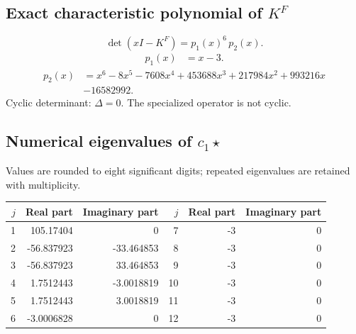 \documentclass[10pt,a4paper]{article}
\begin{document}
\subsection*{Exact characteristic polynomial of $K^F$}
\[\det(xI-K^F)=p_{1}(x)^{6}\,p_{2}(x).\]
\[\begin{aligned}p_{1}(x)&=x - 3.\end{aligned}\]
\[\begin{aligned}p_{2}(x)&=x^{6} - 8 x^{5} - 7608 x^{4} + 453688 x^{3} + 217984 x^{2} + 993216 x\\&-16582992.\end{aligned}\]
Cyclic determinant: $\Delta=0$. The specialized operator is not cyclic.
\subsection*{Numerical eigenvalues of $c_1\star$}
Values are rounded to eight significant digits; repeated eigenvalues are retained with multiplicity.
\begin{center}\small\begin{tabular}{rrr@{\qquad}rrr}\toprule $j$ & Real part & Imaginary part & $j$ & Real part & Imaginary part\\\midrule
1 & 105.17404 & 0 & 7 & -3 & 0\\
2 & -56.837923 & -33.464853 & 8 & -3 & 0\\
3 & -56.837923 & 33.464853 & 9 & -3 & 0\\
4 & 1.7512443 & -3.0018819 & 10 & -3 & 0\\
5 & 1.7512443 & 3.0018819 & 11 & -3 & 0\\
6 & -3.0006828 & 0 & 12 & -3 & 0\\
\bottomrule\end{tabular}\end{center}
\end{document}

